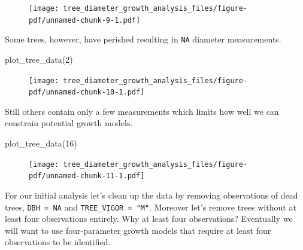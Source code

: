 \documentclass[
  letterpaper,
  DIV=11,
  numbers=noendperiod]{scrartcl}
\newenvironment{Shaded}{\begin{snugshade}}{\end{snugshade}}
\newcommand{\DecValTok}[1]{\textcolor[rgb]{0.68,0.00,0.00}{#1}}
\newcommand{\FunctionTok}[1]{\textcolor[rgb]{0.28,0.35,0.67}{#1}}
\newcommand{\NormalTok}[1]{\textcolor[rgb]{0.00,0.23,0.31}{#1}}
\begin{document}
\begin{figure}[H]

{\centering \texttt{[image: tree\_diameter\_growth\_analysis\_files/figure-pdf/unnamed-chunk-9-1.pdf]}

}

\end{figure}

Some trees, however, have perished resulting in \texttt{NA} diameter
measurements.

\begin{Shaded}
\begin{Highlighting}[]
\FunctionTok{plot\_tree\_data}\NormalTok{(}\DecValTok{2}\NormalTok{)}
\end{Highlighting}
\end{Shaded}

\begin{figure}[H]

{\centering \texttt{[image: tree\_diameter\_growth\_analysis\_files/figure-pdf/unnamed-chunk-10-1.pdf]}

}

\end{figure}

Still others contain only a few measurements which limits how well we
can constrain potential growth models.

\begin{Shaded}
\begin{Highlighting}[]
\FunctionTok{plot\_tree\_data}\NormalTok{(}\DecValTok{16}\NormalTok{)}
\end{Highlighting}
\end{Shaded}

\begin{figure}[H]

{\centering \texttt{[image: tree\_diameter\_growth\_analysis\_files/figure-pdf/unnamed-chunk-11-1.pdf]}

}

\end{figure}

For our initial analysis let's clean up the data by removing
observations of dead trees, \texttt{DBH\ =\ NA} and
\texttt{TREE\_VIGOR\ =\ "M"}. Moreover let's remove trees without at
least four observations entirely. Why at least four observations?
Eventually we will want to use four-parameter growth models that require
at least four observations to be identified.
\end{document}
